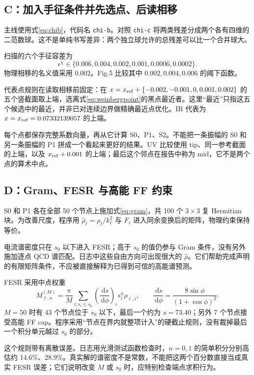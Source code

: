 \documentclass[UTF8,a4paper,11pt,fontset=fandol]{ctexart}
\numberwithin{equation}{section}
\newcommand{\dd}{\,\mathrm d}
\newcommand{\eChi}{\epsilon^{\chi}}
\newcommand{\code}[1]{{\urlstyle{tt}\nolinkurl{#1}}}
\begin{document}
\subsection{C：加入手征条件并先选点、后读相移}
主线使用式\eqref{eq:chib}，代码名 \code{chi-b}。对照 \code{chi-c} 将两类残差分成两个各有四维的二范数球。这不是单纯书写差异：两个独立球允许的总残差可以比一个合并球大。

扫描的六个手征容差为
\begin{equation}
\eChi\in\{0.006,0.004,0.002,0.001,0.0006,0.0002\}.
\end{equation}
物理相移的名义值采用 \(0.002\)。Fig.5 比较其中 \(0.002,0.004,0.006\) 的阈下函数。

代表点规则在读取相移前固定：在 \(x=x_{\rm ref}+\{-0.002,-0.001,0,0.001,0.002\}\) 的五个竖截面取上端，选离式\eqref{eq:weinbergpoint}的黑点最近者。这里“最近”只指这五个候选中的最近，并非已对连续边界做精确最近点优化。IR 代表为 \(x=x_{\rm ref}=0.07332139057\) 的上端。

每个点都保存完整系数向量，再从它计算 S0、P1、S2。不能把一条振幅的 S0 和另一条振幅的 P1 拼成一个看起来更好的结果。UV 比较使用 tip、同一参考截面的上端，以及 \(x_{\rm ref}+0.001\) 的上端；最后这个邻点在报告中称为 mid，它不是两个点的算术中点。

\subsection{D：Gram、FESR 与高能 FF 约束}
S0 和 P1 各在全部 50 个节点上施加式\eqref{eq:gram}，共 100 个 \(3\times3\) 复 Hermitian 块。为改善尺度，程序用 \(\widehat\rho_\ell=\rho_\ell/k_\ell^2\) 与 \(F_\ell\) 进入同余变换后的矩阵，物理约束保持等价。

电流谱密度只在 \(s_0\) 以下进入 FESR；高于 \(s_0\) 的值仍参与 Gram 条件，没有另外施加逐点 QCD 谱匹配。日志中这些自由方向可出现很大的 \(\widehat\rho\)。它们帮助完成声明的有限矩阵条件，不应被直接解释为已得到可信的高能谱预测。

FESR 采用中点权重
\begin{equation}\label{eq:quad}
M_{\ell,n}^{(M)}=\frac\pi M\sum_{i:s_i\le s_0}
\left(\frac{\dd s}{\dd\phi}\right)_i s_i^n\rho_{\ell,i},\qquad
\frac{\dd s}{\dd\phi}=\frac{8\sin\phi}{(1+\cos\phi)^2}.
\end{equation}
\(M=50\) 时有 43 个节点位于 \(s_0\) 以下，最后一个约为 \(s=73.40\)；另外 7 个节点接受高能 FF cap。程序采用“节点在界内就整项计入”的硬截止规则，没有裁掉最后一个积分单元越过 \(s_0\) 的部分。

这个规则带有离散误差。日志用光滑测试函数检查时，\(n=0,1\) 的简单积分分别高估约 14.6\%、28.9\%。真实解的谱密度不是常数，不能把这两个百分数直接当成真实 FESR 误差；它们说明改变 \(M\) 或 \(s_0\) 时，应特别检查端点求积行为。
\end{document}
